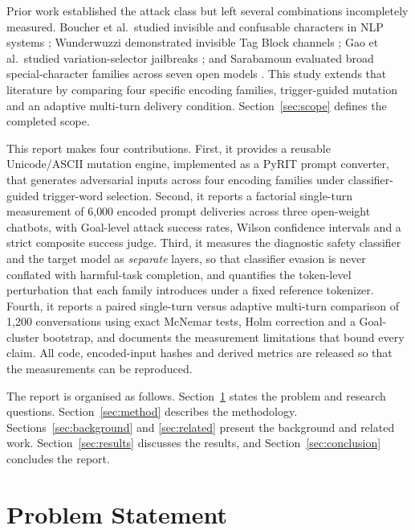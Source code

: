 \documentclass[a4paper,12pt]{article}
\begin{document}
Prior work established the attack class but left several combinations incompletely
measured. Boucher et al.\ studied invisible and confusable characters in NLP systems
\cite{boucher2022bad}; Wunderwuzzi demonstrated invisible Tag Block channels
\cite{wunderwuzzi2024ascii}; Gao et al.\ studied variation-selector jailbreaks
\cite{pang2025imperceptible}; and Sarabamoun evaluated broad special-character
families across seven open models \cite{sarabamoun2025special}. This study extends
that literature by comparing four specific encoding families, trigger-guided mutation
and an adaptive multi-turn delivery condition. Section~\ref{sec:scope} defines the
completed scope.

This report makes four contributions. First, it provides a reusable
Unicode/ASCII mutation engine, implemented as a PyRIT prompt converter, that generates
adversarial inputs across four encoding families under classifier-guided trigger-word
selection. Second, it reports a factorial single-turn measurement of 6{,}000 encoded
prompt deliveries across three open-weight chatbots, with Goal-level attack success
rates, Wilson confidence intervals and a strict composite success judge. Third, it
measures the diagnostic safety classifier and the target model as \emph{separate}
layers, so that classifier evasion is never conflated with harmful-task completion,
and quantifies the token-level perturbation that each family introduces under a fixed
reference tokenizer. Fourth, it reports a paired single-turn versus adaptive
multi-turn comparison of 1{,}200 conversations using exact McNemar tests, Holm
correction and a Goal-cluster bootstrap, and documents the measurement limitations
that bound every claim. All code, encoded-input hashes and derived metrics are
released so that the measurements can be reproduced.

The report is organised as follows. Section~\ref{sec:problem}
states the problem and research questions. Section~\ref{sec:method} describes the
methodology. Sections~\ref{sec:background} and \ref{sec:related} present the
background and related work. Section~\ref{sec:results} discusses the results, and
Section~\ref{sec:conclusion} concludes the report.

\section{Problem Statement}
\label{sec:problem}
\end{document}
